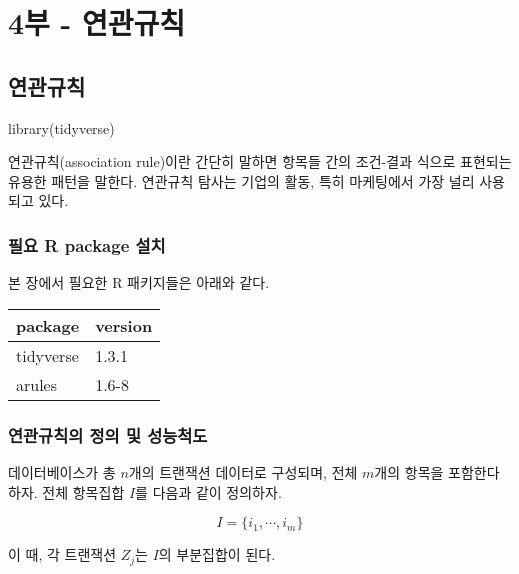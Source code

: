 \documentclass[
]{book}
\newenvironment{Shaded}{\begin{snugshade}}{\end{snugshade}}
\newcommand{\FunctionTok}[1]{\textcolor[rgb]{0.00,0.00,0.00}{#1}}
\newcommand{\NormalTok}[1]{#1}
\begin{document}
\hypertarget{part-4uxbd80---uxc5f0uxad00uxaddcuxce59}{%
\part{4부 - 연관규칙}\label{part-4uxbd80---uxc5f0uxad00uxaddcuxce59}}

\hypertarget{association-rule}{%
\chapter{연관규칙}\label{association-rule}}

\begin{Shaded}
\begin{Highlighting}[]
\FunctionTok{library}\NormalTok{(tidyverse)}
\end{Highlighting}
\end{Shaded}

연관규칙(association rule)이란 간단히 말하면 항목들 간의 조건-결과 식으로 표현되는 유용한 패턴을 말한다. 연관규칙 탐사는 기업의 활동, 특히 마케팅에서 가장 널리 사용되고 있다.

\hypertarget{association-packages-install}{%
\section{필요 R package 설치}\label{association-packages-install}}

본 장에서 필요한 R 패키지들은 아래와 같다.

\begin{tabular}{l|l}
\hline
package & version\\
\hline
tidyverse & 1.3.1\\
\hline
arules & 1.6-8\\
\hline
\end{tabular}

\hypertarget{association-rule-definition-metric}{%
\section{연관규칙의 정의 및 성능척도}\label{association-rule-definition-metric}}

데이터베이스가 총 \(n\)개의 트랜잭션 데이터로 구성되며, 전체 \(m\)개의 항목을 포함한다 하자. 전체 항목집합 \(I\)를 다음과 같이 정의하자.

\begin{equation*}
I = \{ i_1, \cdots, i_m \}
\end{equation*}

이 때, 각 트랜잭션 \(Z_j\)는 \(I\)의 부분집합이 된다.
\end{document}
